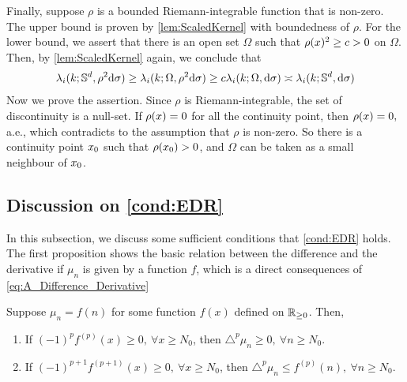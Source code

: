 Finally, suppose $\rho$ is a bounded Riemann-integrable function that is non-zero.
The upper bound is proven by \cref{lem:ScaledKernel} with boundedness of $\rho$.
For the lower bound, we assert that there is an open set $\Omega$ such that
$\rho(x)^2 \geq c > 0$ on $\Omega$.
Then, by \cref{lem:ScaledKernel} again, we conclude that
\begin{align*}
  \lambda_i(k;\mathbb{S}^d, \rho^2 \dd \sigma) \geq
  \lambda_i(k; \Omega,\rho^2 \dd \sigma) \geq c \lambda_i(k;\Omega,\dd \sigma)
  \asymp \lambda_i(k;\mathbb{S}^d, \dd \sigma)
\end{align*}
Now we prove the assertion.
Since $\rho$ is Riemann-integrable, the set of discontinuity is a null-set.
If $\rho(x) = 0$ for all the continuity point, then $\rho(x) = 0, $ a.e., which contradicts to the assumption that $\rho$ is non-zero.
So there is a continuity point $x_0$ such that $\rho(x_0) > 0$, and $\Omega$ can be taken as a small neighbour of $x_0$.



\subsection{Discussion on \cref{cond:EDR}}
\label{subsec:EDR_Cond_Discussion}

In this subsection, we discuss some sufficient conditions that \cref{cond:EDR} holds.
The first proposition shows the basic relation between the difference and the derivative if $\mu_n$ is given by a function $f$,
which is a direct consequences of \cref{eq:A_Difference_Derivative}

\begin{proposition}
  Suppose $\mu_n = f(n)$ for some function $f(x)$ defined on $\mathbb{R}_{\geq 0}$.
  Then,
  \begin{enumerate}[(1)]
    \item If $(-1)^p f^{(p)}(x) \geq 0,~\forall x \geq N_0$,  then $\triangle^p \mu_n \geq 0,~\forall n \geq N_0$.
    \item If $(-1)^{p+1}f^{(p+1)}(x) \geq 0,~\forall x \geq N_0$, then
    $\triangle^p \mu_n \leq f^{(p)}(n),~\forall n \geq N_0$.
  \end{enumerate}
\end{proposition}

